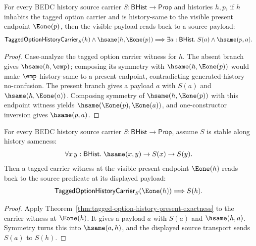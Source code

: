 \begin{theorem}
\label{thm:tagged-option-history-carrier-present-hsame-readback}
For every BEDC history source carrier $S:\mathsf{BHist}\to\mathsf{Prop}$ and
histories $h,p$, if $h$ inhabits the tagged option carrier and is history-same
to the visible present endpoint $\Eone(p)$, then the visible payload reads back
to a source payload:
$$
\mathsf{TaggedOptionHistoryCarrier}_S(h)\land\hsame(h,\Eone(p))
\Longrightarrow
\exists a:\mathsf{BHist}.\; S(a)\land\hsame(p,a).
$$
\end{theorem}
\begin{proof}
Case-analyze the tagged option carrier witness for $h$. The absent branch gives
$\hsame(h,\emp)$; composing its symmetry with $\hsame(h,\Eone(p))$ would make
$\emp$ history-same to a present endpoint, contradicting generated-history
no-confusion. The present branch gives a payload $a$ with $S(a)$ and
$\hsame(h,\Eone(a))$. Composing symmetry of $\hsame(h,\Eone(p))$ with this
endpoint witness yields $\hsame(\Eone(p),\Eone(a))$, and one-constructor
inversion gives $\hsame(p,a)$.
\end{proof}

\begin{theorem}
\label{thm:tagged-option-history-carrier-present-source-transport}
For every BEDC history source carrier $S:\mathsf{BHist}\to\mathsf{Prop}$,
assume $S$ is stable along history sameness:
$$
\forall x\,y:\mathsf{BHist}.\;\hsame(x,y)\to S(x)\to S(y).
$$
Then a tagged carrier witness at the visible present endpoint $\Eone(h)$ reads
back to the source predicate at its displayed payload:
$$
\mathsf{TaggedOptionHistoryCarrier}_S(\Eone(h))\Longrightarrow S(h).
$$
\end{theorem}
\begin{proof}
Apply Theorem~\ref{thm:tagged-option-history-present-exactness} to the carrier
witness at $\Eone(h)$. It gives a payload $a$ with $S(a)$ and
$\hsame(h,a)$. Symmetry turns this into $\hsame(a,h)$, and the displayed source
transport sends $S(a)$ to $S(h)$.
\end{proof}

